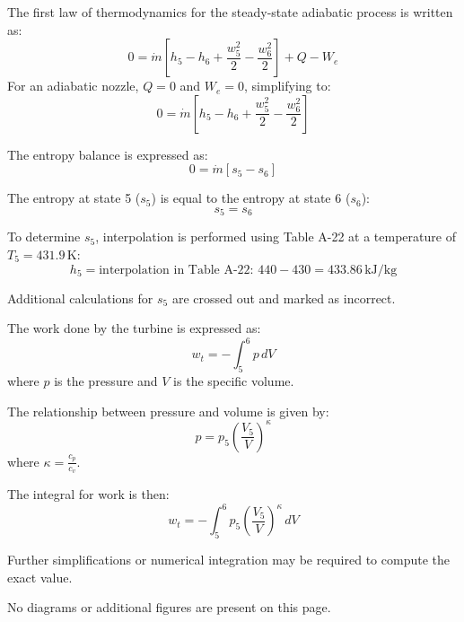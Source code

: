 The first law of thermodynamics for the steady-state adiabatic process is written as:  
\[
0 = \dot{m} \left[ h_5 - h_6 + \frac{w_5^2}{2} - \frac{w_6^2}{2} \right] + Q - W_e
\]  
For an adiabatic nozzle, \(Q = 0\) and \(W_e = 0\), simplifying to:  
\[
0 = \dot{m} \left[ h_5 - h_6 + \frac{w_5^2}{2} - \frac{w_6^2}{2} \right]
\]  

The entropy balance is expressed as:  
\[
0 = \dot{m} \left[ s_5 - s_6 \right]
\]  

The entropy at state 5 (\(s_5\)) is equal to the entropy at state 6 (\(s_6\)):  
\[
s_5 = s_6
\]  

To determine \(s_5\), interpolation is performed using Table A-22 at a temperature of \(T_5 = 431.9 \, \text{K}\):  
\[
h_5 = \text{interpolation in Table A-22: } 440 - 430 = 433.86 \, \text{kJ/kg}
\]  

Additional calculations for \(s_5\) are crossed out and marked as incorrect.

The work done by the turbine is expressed as:  
\[
w_t = -\int_5^6 p \, dV
\]  
where \( p \) is the pressure and \( V \) is the specific volume.  

The relationship between pressure and volume is given by:  
\[
p = p_5 \left(\frac{V_5}{V}\right)^\kappa
\]  
where \( \kappa = \frac{c_p}{c_v} \).  

The integral for work is then:  
\[
w_t = -\int_5^6 p_5 \left(\frac{V_5}{V}\right)^\kappa \, dV
\]  

Further simplifications or numerical integration may be required to compute the exact value.  

No diagrams or additional figures are present on this page.